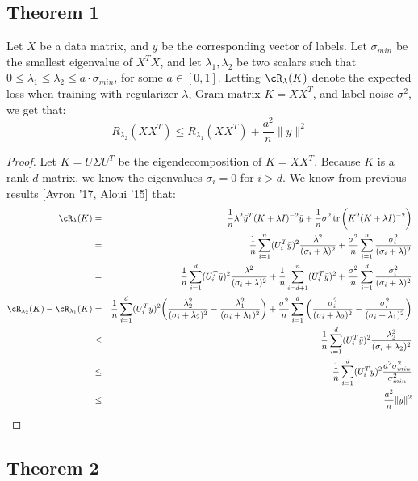 \documentclass[12pt]{article}
\newcommand{\by}{\bar{y}}
\newcommand{\sm}{\sigma_{min}}
\providecommand{\tr}{\mathop{\rm tr}}
\begin{document}
\subsection{Theorem 1}
\begin{theorem}
Let $X$ be a data matrix, and $\by$ be the corresponding vector of labels. Let $\sm$ be the smallest eigenvalue of $X^T X$, and let $\lambda_1, \lambda_2$ be two scalars such that $0 \leq \lambda_1 \leq \lambda_2 \leq a\cdot \sm$, for some $a \in [0,1]$. Letting $\cR_{\lambda}(K)$ denote the expected loss when training with regularizer $\lambda$, Gram matrix $K = XX^T$, and label noise $\sigma^2$, we get that:
\begin{equation}
R_{\lambda_2}(XX^T) \leq R_{\lambda_1}(XX^T) + \frac{a^2}{n}\|y\|^2
\end{equation}
\end{theorem}
\begin{proof}
Let $K = U\Sigma U^T$ be the eigendecomposition of $K = XX^T$. Because $K$ is a rank $d$ matrix, we know the eigenvalues $\sigma_i=0$ for $i > d$.  We know from previous results [Avron '17, Aloui '15] that:
\begin{eqnarray*}
\cR_{\lambda}(K) &=& \frac{1}{n}\lambda^2\by^T(K+\lambda I)^{-2} \by + \frac{1}{n}\sigma^2 \tr\bigg(K^2(K+\lambda I)^{-2}\bigg) \\
&=& \frac{1}{n}\sum_{i=1}^n (U_i^T \by)^2\frac{\lambda^2}{(\sigma_i + \lambda)^2} + \frac{\sigma^2}{n}\sum_{i=1}^n \frac{\sigma_i^2}{(\sigma_i + \lambda)^2} \\
&=& \frac{1}{n}\sum_{i=1}^d (U_i^T \by)^2\frac{\lambda^2}{(\sigma_i + \lambda)^2} +
\frac{1}{n}\sum_{i=d+1}^n (U_i^T \by)^2 +
 \frac{\sigma^2}{n}\sum_{i=1}^d \frac{\sigma_i^2}{(\sigma_i + \lambda)^2} \\
\cR_{\lambda_2}(K) - \cR_{\lambda_1}(K) 
&=& \frac{1}{n}\sum_{i=1}^d (U_i^T \by)^2\bigg(\frac{\lambda_2^2}{(\sigma_i + \lambda_2)^2} - \frac{\lambda_1^2}{(\sigma_i + \lambda_1)^2}\bigg) +
\frac{\sigma^2}{n}\sum_{i=1}^d \bigg(\frac{\sigma_i^2}{(\sigma_i + \lambda_2)^2} - \frac{\sigma_i^2}{(\sigma_i + \lambda_1)^2} \bigg)\\
&\leq& \frac{1}{n}\sum_{i=1}^d (U_i^T \by)^2\frac{\lambda_2^2}{(\sigma_i + \lambda_2)^2}\\
&\leq& \frac{1}{n}\sum_{i=1}^d (U_i^T \by)^2\frac{a^2 \sm^2}{\sm^2}\\
&\leq& \frac{a^2}{n}\|y\|^2
\end{eqnarray*}
\end{proof}
\subsection{Theorem 2}
\end{document}
